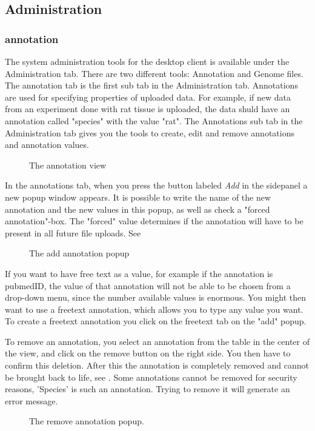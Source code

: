 \subsection{Administration}
\subsubsection{annotation}

The system administration tools for the desktop client is available under the Administration tab. There are two different tools: Annotation and Genome files. The annotation tab is the first sub tab in the Administration tab. Annotations are used for specifying properties of uploaded data. For example, if new data from an experiment done with rat tissue is uploaded, the data shuld have an annotation called "species" with the value "rat". The Annotations sub tab in the Administration tab gives you the tools to create, edit and remove annotations and annotation values. 
\begin{figure}[htb]
	\caption{The annotation view}
	\label{fig:annotationsView}
\end{figure}

In the annotations tab, when you press the button labeled \textit{Add} in the sidepanel a new popup window appears. It is possible to write the name of the new annotation and the new values in this popup, as well as check a "forced annotation"-box. The "forced" value determines if the annotation will have to be present in all future file uploads. See 

\begin{figure}[htb]
	\caption{The add annotation popup}
	\label{fig:adm_addAnnotationPopup}
\end{figure}

If you want to have free text as a value, for example if the annotation is pubmedID, the value of that annotation will not be able to be chosen from a drop-down menu, since the number available values is enormous. You might then want to use a freetext annotation, which allows you to type any value you want. To create a freetext annotation you click on the freetext tab on the "add" popup. 


To remove an annotation, you select an annotation from the table in the center of the view, and click on the remove button on the right side. You then have to confirm this deletion. After this the annotation is completely removed and cannot be brought back to life, see . Some annotations cannot be removed for security reasons, 'Species' is such an annotation. Trying to remove it will generate an error message.
\begin{figure}[h!]
\caption{The remove annotation popup.}
\label{fig:adm_desktopRemoveAnnotation}
\end{figure}
